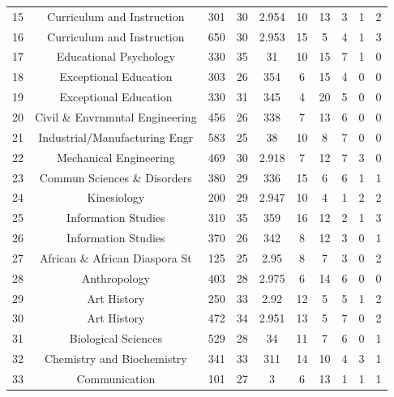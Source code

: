 \documentclass[12pt,letterpaper,oneside,openany]{book}
\begin{document}
\begin{center}
\begin{longtable}{c||ccccccccc}
15 & Curriculum and Instruction      & 301   & 30                & 2.954 & 10 & 13 & 3 & 1 & 2 \\
16 & Curriculum and Instruction      & 650   & 30                & 2.953 & 15 & 5  & 4 & 1 & 3 \\
17 & Educational Psychology          & 330   & 35                & 31  & 10 & 15 & 7 & 1 & 0 \\
18 & Exceptional Education           & 303   & 26                & 354 & 6  & 15 & 4 & 0 & 0 \\
19 & Exceptional Education           & 330   & 31                & 345 & 4  & 20 & 5 & 0 & 0 \\
20 & Civil \& Envrnmntal Engineering & 456   & 26                & 338 & 7  & 13 & 6 & 0 & 0 \\
21 & Industrial/Manufacturing Engr   & 583   & 25                & 38  & 10 & 8  & 7 & 0 & 0 \\
22 & Mechanical Engineering          & 469   & 30                & 2.918 & 7  & 12 & 7 & 3 & 0 \\
23 & Commun Sciences \& Disorders    & 380   & 29                & 336 & 15 & 6  & 6 & 1 & 1 \\
24 & Kinesiology                     & 200   & 29                & 2.947 & 10 & 4  & 1 & 2 & 2 \\
25 & Information Studies             & 310   & 35                & 359 & 16 & 12 & 2 & 1 & 3 \\
26 & Information Studies             & 370   & 26                & 342 & 8  & 12 & 3 & 0 & 1 \\
27 & African \& African Diaspora St  & 125   & 25                & 2.95  & 8  & 7  & 3 & 0 & 2 \\
28 & Anthropology                    & 403   & 28                & 2.975 & 6  & 14 & 6 & 0 & 0 \\
29 & Art History                     & 250   & 33                & 2.92  & 12 & 5  & 5 & 1 & 2 \\
30 & Art History                     & 472   & 34                & 2.951 & 13 & 5  & 7 & 0 & 2 \\
31 & Biological Sciences             & 529   & 28                & 34  & 11 & 7  & 6 & 0 & 1 \\
32 & Chemistry and Biochemistry      & 341   & 33                & 311 & 14 & 10 & 4 & 3 & 1 \\
33 & Communication                   & 101   & 27                & 3   & 6  & 13 & 1 & 1 & 1 \\

\end{longtable}
\end{center}
\end{document}
